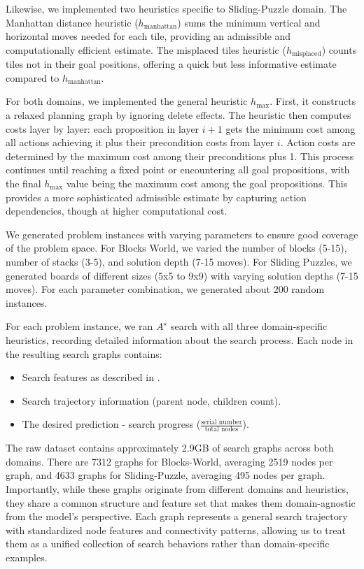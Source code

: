 \documentclass[letterpaper]{article}
\begin{document}
Likewise, we implemented two heuristics specific to Sliding-Puzzle domain. The Manhattan distance heuristic ($h_{\text{manhattan}}$) sums the minimum vertical and horizontal moves needed for each tile, providing an admissible and computationally efficient estimate. The misplaced tiles heuristic ($h_{\text{misplaced}}$) counts tiles not in their goal positions, offering a quick but less informative estimate compared to $h_{\text{manhattan}}$.

For both domains, we implemented the general heuristic $h_{\max}$. First, it constructs a relaxed planning graph by ignoring delete effects. The heuristic then computes costs layer by layer: each proposition in layer $i+1$ gets the minimum cost among all actions achieving it plus their precondition costs from layer $i$. Action costs are determined by the maximum cost among their preconditions plus 1. This process continues until reaching a fixed point or encountering all goal propositions, with the final $h_{\max}$ value being the maximum cost among the goal propositions. This provides a more sophisticated admissible estimate by capturing action dependencies, though at higher computational cost.

We generated problem instances with varying parameters to ensure good coverage of the problem space. For Blocks World, we varied the number of blocks (5-15), number of stacks (3-5), and solution depth (7-15 moves). For Sliding Puzzles, we generated boards of different sizes (5x5 to 9x9) with varying solution depths (7-15 moves). For each parameter combination, we generated about 200 random instances.

For each problem instance, we ran $A^{\star}$ search with all three domain-specific heuristics, recording detailed information about the search process. Each node in the resulting search graphs contains:
\begin{itemize}
    \item Search features as described in .
    \item Search trajectory information (parent node, children count).
    \item The desired prediction - search progress ($\frac{\text{serial number}}{\text{total nodes}}$).
\end{itemize}

The raw dataset contains approximately 2.9GB of search graphs across both domains. There are 7312 graphs for Blocks-World, averaging 2519 nodes per graph, and 4633 graphs for Sliding-Puzzle, averaging 495 nodes per graph. Importantly, while these graphs originate from different domains and heuristics, they share a common structure and feature set that makes them domain-agnostic from the model's perspective. Each graph represents a general search trajectory with standardized node features and connectivity patterns, allowing us to treat them as a unified collection of search behaviors rather than domain-specific examples.
\end{document}

